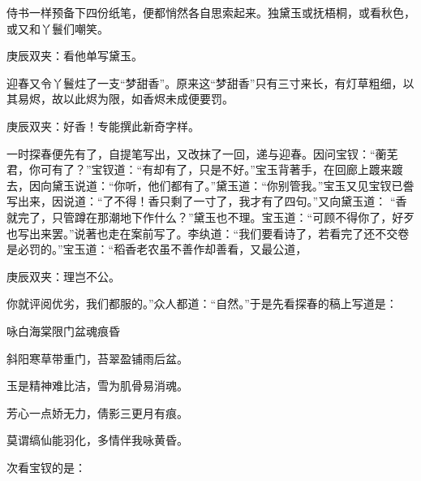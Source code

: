 \begin{parag}
    侍书一样预备下四份纸笔，便都悄然各自思索起来。独黛玉或抚梧桐，或看秋色，或又和丫鬟们嘲笑。\begin{note}庚辰双夹：看他单写黛玉。\end{note}迎春又令丫鬟炷了一支“梦甜香”。原来这“梦甜香”只有三寸来长，有灯草粗细，以其易烬，故以此烬为限，如香烬未成便要罚。\begin{note}庚辰双夹：好香！专能撰此新奇字样。\end{note}一时探春便先有了，自提笔写出，又改抹了一回，递与迎春。因问宝钗：“蘅芜君，你可有了？”宝钗道：“有却有了，只是不好。”宝玉背著手，在回廊上踱来踱去，因向黛玉说道：“你听，他们都有了。”黛玉道：“你别管我。”宝玉又见宝钗已誊写出来，因说道：“了不得！香只剩了一寸了，我才有了四句。”又向黛玉道： “香就完了，只管蹲在那潮地下作什么？”黛玉也不理。宝玉道：“可顾不得你了，好歹也写出来罢。”说著也走在案前写了。李纨道：“我们要看诗了，若看完了还不交卷是必罚的。”宝玉道：“稻香老农虽不善作却善看，又最公道，\begin{note}庚辰双夹：理岂不公。\end{note}你就评阅优劣，我们都服的。”众人都道：“自然。”于是先看探春的稿上写道是：
\end{parag}


\begin{poem}
    \begin{pl}咏白海棠限门盆魂痕昏\end{pl}

    \begin{pl}斜阳寒草带重门，苔翠盈铺雨后盆。\end{pl}

    \begin{pl}玉是精神难比洁，雪为肌骨易消魂。\end{pl}

    \begin{pl}芳心一点娇无力，倩影三更月有痕。\end{pl}

    \begin{pl}莫谓缟仙能羽化，多情伴我咏黄昏。\end{pl}
\end{poem}


\begin{parag}
    次看宝钗的是：
\end{parag}


